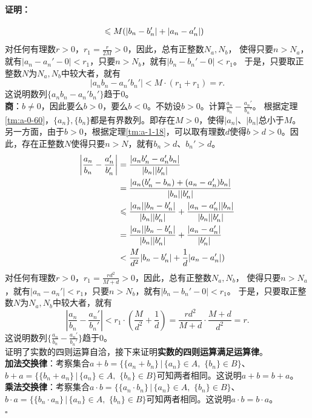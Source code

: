 \documentclass[12pt,UTF8]{ctexbook}
\renewenvironment{proof}{\paragraph{\textbf{证明：}}}{\hfill$\square$}
\begin{document}
\begin{appendix}
\begin{proof}
\begin{align}
        &\leqslant M(|b_n - b_n'| + |a_n - a_n'|) \notag 
    \end{align}
    对任何有理数$r>0$，$r_1 = \frac{r}{2M}>0$，因此，总有正整数$N_a,N_b$，
    使得只要$n>N_a$，就有$|a_n - a_n' - 0| < r_1$，只要$n>N_b$，就有$|b_n - b_n' - 0| < r_1$。
    于是，只要取正整数$N$为$N_a,N_b$中较大者，就有
    $$ |a_nb_n - a_n'b_n'| < M\cdot \left(r_1 + r_1\right) = r.$$
    这说明数列$\{a_nb_n - a_n'b_n'\}$趋于$0$。\\
    \textbf{商}：$b\neq 0$，因此要么$b>0$，要么$b<0$。不妨设$b>0$。计算$\frac{a_n}{b_n} - \frac{a_n'}{b_n'}$。
    根据定理\ref{tm:a-0-60}，$\{a_n\}, \{b_n\}$都是有界数列。即存在$M>0$，使得$|a_n|$、$|b_n|$总小于$M$。
    另一方面，由于$b>0$，根据定理\ref{tm:a-1-18}，可以取有理数$d$使得$b>d>0$。因此，存在正整数$N$使得只要$n>N$，就有$b_n>d$、$b_n'>d$。
    \begin{align}
        \left|\frac{a_n}{b_n} - \frac{a_n'}{b_n'}\right| &= \frac{|a_nb_n' - a_n'b_n|}{|b_n||b_n'|} \notag \\
        &= \frac{|a_n(b_n' - b_n) + (a_n - a_n')b_n|}{|b_n||b_n'|} \notag \\
        &\leqslant \frac{|a_n||b_n - b_n'|}{|b_n||b_n'|} + \frac{|a_n - a_n'||b_n|}{|b_n||b_n'|} \notag \\
        &= \frac{|a_n||b_n - b_n'|}{|b_n||b_n'|} + \frac{|a_n - a_n'|}{|b_n'|} \notag \\
        &< \frac{M}{d^2}|b_n - b_n'| + \frac{1}{d}|a_n - a_n'|) \notag 
    \end{align}
    对任何有理数$r>0$，$r_1 = \frac{rd^2}{M+d}>0$，因此，总有正整数$N_a,N_b$，
    使得只要$n>N_a$，就有$|a_n - a_n'| < r_1$，只要$n>N_b$，就有$|b_n - b_n' - 0| < r_1$。
    于是，只要取正整数$N$为$N_a,N_b$中较大者，就有
    $$ \left|\frac{a_n}{b_n} - \frac{a_n'}{b_n'}\right| < r_1\cdot \left(\frac{M}{d^2} + \frac{1}{d}\right) = \frac{rd^2}{M+d}\cdot \frac{M+d}{d^2} = r.$$
    这说明数列$\{\frac{a_n}{b_n} - \frac{a_n'}{b_n'}\}$趋于$0$。\\
    证明了实数的四则运算自洽，接下来证明\textbf{实数的四则运算满足运算律}。\\
    \textbf{加法交换律}：考察集合$a + b = \{\{a_n + b_n\} \, |\, \{a_n\}\in A,\,\,\{b_n\}\in B \}$、
    $b + a = \{\{b_n + a_n\} \, |\, \{a_n\}\in A,\,\,\{b_n\}\in B \}$可知两者相同。这说明$a + b = b + a$。\\
    \textbf{乘法交换律}：考察集合$a\cdot b = \{\{a_n \cdot b_n\} \, |\, \{a_n\}\in A,\,\,\{b_n\}\in B \}$、
    $b\cdot a = \{\{b_n \cdot a_n\} \, |\, \{a_n\}\in A,\,\,\{b_n\}\in B \}$可知两者相同。这说明$a \cdot b = b \cdot a$。\\

\end{proof}
\end{appendix}
\end{document}
